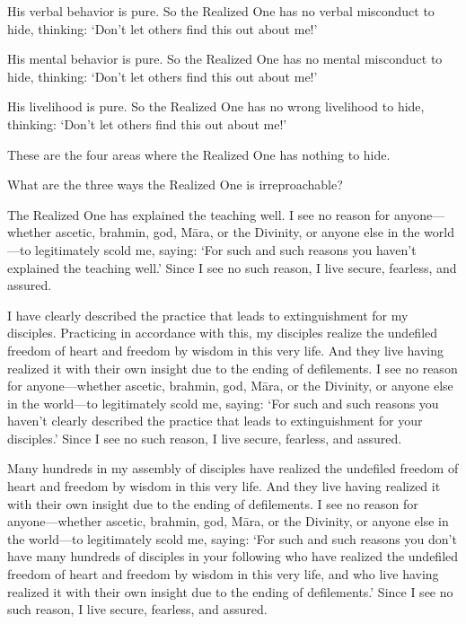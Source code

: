 \documentclass[12pt,openany]{book}%
\begin{document}
His verbal behavior is pure. So the Realized One has no verbal misconduct to hide, thinking: ‘Don’t let others find this out about me!’ 

His mental behavior is pure. So the Realized One has no mental misconduct to hide, thinking: ‘Don’t let others find this out about me!’ 

His livelihood is pure. So the Realized One has no wrong livelihood to hide, thinking: ‘Don’t let others find this out about me!’ 

These are the four areas where the Realized One has nothing to hide. 

What are the three ways the Realized One is irreproachable? 

The Realized One has explained the teaching well. I see no reason for anyone—whether ascetic, brahmin, god, \textsanskrit{Māra}, or the Divinity, or anyone else in the world—to legitimately scold me, saying: ‘For such and such reasons you haven’t explained the teaching well.’ Since I see no such reason, I live secure, fearless, and assured. 

I have clearly described the practice that leads to extinguishment for my disciples. Practicing in accordance with this, my disciples realize the undefiled freedom of heart and freedom by wisdom in this very life. And they live having realized it with their own insight due to the ending of defilements. I see no reason for anyone—whether ascetic, brahmin, god, \textsanskrit{Māra}, or the Divinity, or anyone else in the world—to legitimately scold me, saying: ‘For such and such reasons you haven’t clearly described the practice that leads to extinguishment for your disciples.’ Since I see no such reason, I live secure, fearless, and assured. 

Many hundreds in my assembly of disciples have realized the undefiled freedom of heart and freedom by wisdom in this very life. And they live having realized it with their own insight due to the ending of defilements. I see no reason for anyone—whether ascetic, brahmin, god, \textsanskrit{Māra}, or the Divinity, or anyone else in the world—to legitimately scold me, saying: ‘For such and such reasons you don’t have many hundreds of disciples in your following who have realized the undefiled freedom of heart and freedom by wisdom in this very life, and who live having realized it with their own insight due to the ending of defilements.’ Since I see no such reason, I live secure, fearless, and assured. 
\end{document}
